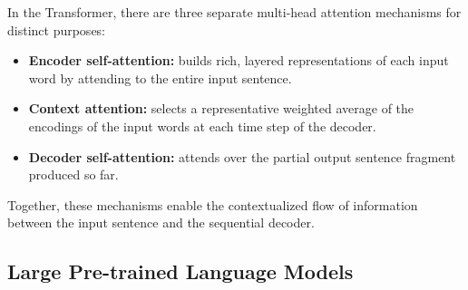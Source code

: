 In the Transformer, there are three separate multi-head attention mechanisms for
distinct purposes:
\begin{itemize}
    \item \textbf{Encoder self-attention:} builds rich, layered representations of
          each input word by attending to the entire input sentence.
    \item \textbf{Context attention:} selects
          a representative weighted average of the encodings of the input words at each
          time step of the decoder.
    \item \textbf{Decoder self-attention:} attends over the partial output sentence
          fragment produced so far.
\end{itemize}
Together, these mechanisms enable the contextualized flow of information between
the input sentence and the sequential decoder.

\subsection{Large Pre-trained Language Models}
